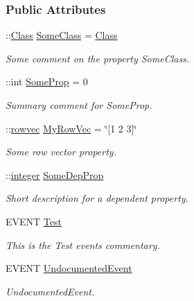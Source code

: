 \subsubsection*{Public Attributes}
\begin{DoxyCompactItemize}
\item 
\+::\hyperlink{classexamples_1_1_class}{Class} \hyperlink{classexamples_1_1_class_aed917135d06017b35cf176628fbc780c}{Some\+Class} = \hyperlink{classexamples_1_1_class}{Class}
\begin{DoxyCompactList}\small\item\em Some comment on the property Some\+Class. \end{DoxyCompactList}\item 
\+::int \hyperlink{classexamples_1_1_class_ae3f0807afb99d8b3bc482712607653c7}{Some\+Prop} = 0
\begin{DoxyCompactList}\small\item\em Summary comment for Some\+Prop. \end{DoxyCompactList}\item 
\+::\hyperlink{classrowvec}{rowvec} \hyperlink{classexamples_1_1_class_ab85289c174b6911551b1523f0ba8392e}{My\+Row\+Vec} = \char`\"{}\mbox{[}1 2 3\mbox{]}\char`\"{}
\begin{DoxyCompactList}\small\item\em Some row vector property. \end{DoxyCompactList}\item 
\+::\hyperlink{classinteger}{integer} \hyperlink{classexamples_1_1_class_a4796b44c2e36e5691e955d947ed7dda2}{Some\+Dep\+Prop}
\begin{DoxyCompactList}\small\item\em Short description for a dependent property. \end{DoxyCompactList}\item 
E\+V\+E\+N\+T \hyperlink{classexamples_1_1_class_a4560097d207de0d55fc6448ae6c63497}{Test}
\begin{DoxyCompactList}\small\item\em This is the Test event\textquotesingle{}s commentary. \end{DoxyCompactList}\item 
E\+V\+E\+N\+T \hyperlink{classexamples_1_1_class_a7e90a67bef80651ad156fd4853261ef4}{Undocumented\+Event}
\begin{DoxyCompactList}\small\item\em Undocumented\+Event. \end{DoxyCompactList}\end{DoxyCompactItemize}
